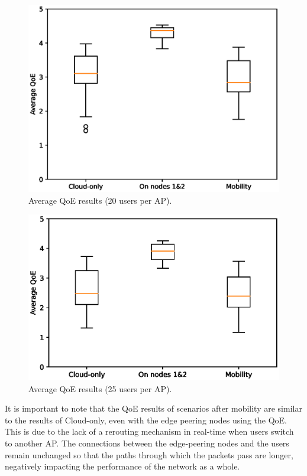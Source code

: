 \begin{figure}[!htb]
    \centering
    \includegraphics[width=\linewidth]{images/QoEBoxplot-20u.eps}
    \vspace{-0.7cm}
    \caption{Average QoE results (20 users per AP).}
    \label{fig:exp-boxplot-20}
\end{figure}

\begin{figure}[!htb]
    \centering
    \includegraphics[width=\linewidth]{images/QoEBoxplot-25u.eps}
    \vspace{-0.7cm}
    \caption{Average QoE results (25 users per AP).}
    \label{fig:exp-boxplot-25}
\end{figure}


It is important to note that the QoE results of scenarios after mobility are similar to the results of Cloud-only, even with the edge peering nodes using the QoE. This is due to the lack of a rerouting mechanism in real-time when users switch to another AP. The connections between the edge-peering nodes and the users remain unchanged so that the paths through which the packets pass are longer, negatively impacting the performance of the network as a whole.

